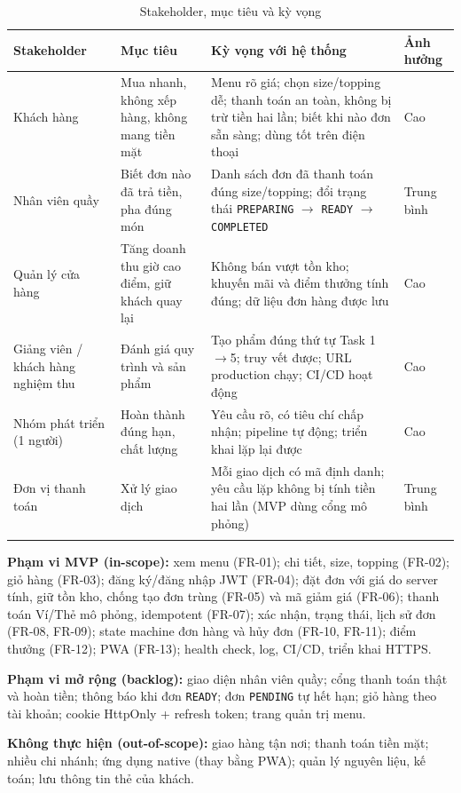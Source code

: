 \documentclass[a4paper]{article}
\newcommand{\st}[1]{\texttt{#1}}
\newcommand{\ra}{\ensuremath{\rightarrow}}
\begin{document}
\begin{longtable}{|L{2.6cm}|L{3.6cm}|L{6.4cm}|L{1.6cm}|}
\hline
\textbf{Stakeholder} & \textbf{Mục tiêu} & \textbf{Kỳ vọng với hệ thống} & \textbf{Ảnh hưởng} \\ \hline
\endhead
Khách hàng & Mua nhanh, không xếp hàng, không mang tiền mặt & Menu rõ giá; chọn size/topping dễ; thanh toán an toàn, không bị trừ tiền hai lần; biết khi nào đơn sẵn sàng; dùng tốt trên điện thoại & Cao \\ \hline
Nhân viên quầy & Biết đơn nào đã trả tiền, pha đúng món & Danh sách đơn đã thanh toán đúng size/topping; đổi trạng thái \st{PREPARING} \ra{} \st{READY} \ra{} \st{COMPLETED} & Trung bình \\ \hline
Quản lý cửa hàng & Tăng doanh thu giờ cao điểm, giữ khách quay lại & Không bán vượt tồn kho; khuyến mãi và điểm thưởng tính đúng; dữ liệu đơn hàng được lưu & Cao \\ \hline
Giảng viên / khách hàng nghiệm thu & Đánh giá quy trình và sản phẩm & Tạo phẩm đúng thứ tự Task 1\ra5; truy vết được; URL production chạy; CI/CD hoạt động & Cao \\ \hline
Nhóm phát triển (1 người) & Hoàn thành đúng hạn, chất lượng & Yêu cầu rõ, có tiêu chí chấp nhận; pipeline tự động; triển khai lặp lại được & Cao \\ \hline
Đơn vị thanh toán & Xử lý giao dịch & Mỗi giao dịch có mã định danh; yêu cầu lặp không bị tính tiền hai lần (MVP dùng cổng mô phỏng) & Trung bình \\ \hline
\caption{Stakeholder, mục tiêu và kỳ vọng}
\end{longtable}

\textbf{Phạm vi MVP (in-scope):} xem menu (FR-01); chi tiết, size, topping (FR-02); giỏ hàng (FR-03); đăng ký/đăng nhập JWT (FR-04); đặt đơn với giá do server tính, giữ tồn kho, chống tạo đơn trùng (FR-05) và mã giảm giá (FR-06); thanh toán Ví/Thẻ mô phỏng, idempotent (FR-07); xác nhận, trạng thái, lịch sử đơn (FR-08, FR-09); state machine đơn hàng và hủy đơn (FR-10, FR-11); điểm thưởng (FR-12); PWA (FR-13); health check, log, CI/CD, triển khai HTTPS.

\textbf{Phạm vi mở rộng (backlog):} giao diện nhân viên quầy; cổng thanh toán thật và hoàn tiền; thông báo khi đơn \st{READY}; đơn \st{PENDING} tự hết hạn; giỏ hàng theo tài khoản; cookie HttpOnly + refresh token; trang quản trị menu.

\textbf{Không thực hiện (out-of-scope):} giao hàng tận nơi; thanh toán tiền mặt; nhiều chi nhánh; ứng dụng native (thay bằng PWA); quản lý nguyên liệu, kế toán; lưu thông tin thẻ của khách.
\end{document}

